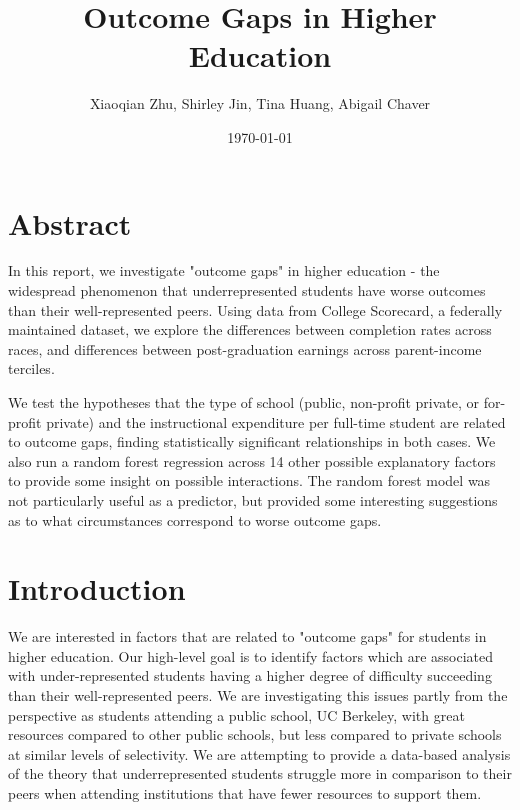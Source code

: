 \documentclass{article}
\title{Outcome Gaps in Higher Education}
\author{Xiaoqian Zhu, Shirley Jin, Tina Huang, Abigail Chaver}
\date{\today}
\begin{document}


\maketitle


\section{Abstract}

In this report, we investigate "outcome gaps" in higher education - the widespread phenomenon that underrepresented students have worse outcomes than their well-represented peers. Using data from College Scorecard, a federally maintained dataset, we explore the differences between completion rates across races, and differences between post-graduation earnings across parent-income terciles.

We test the hypotheses that the type of school (public, non-profit private, or for-profit private) and the instructional expenditure per full-time student are related to outcome gaps, finding statistically significant relationships in both cases. We also run a random forest regression across 14 other possible explanatory factors to provide some insight on possible interactions. The random forest model was not particularly useful as a predictor, but provided some interesting suggestions as to what circumstances correspond to worse outcome gaps.


\section{Introduction}

We are interested in factors that are related to "outcome gaps" for students in higher education. Our high-level goal is to identify factors which are associated with under-represented students having a higher degree of difficulty succeeding than their well-represented peers. We are investigating this issues partly from the perspective as students attending a public school, UC Berkeley, with great resources compared to other public schools, but less compared to private schools at similar levels of selectivity. We are attempting to provide a data-based analysis of the theory that underrepresented students struggle more in comparison to their peers when attending institutions that have fewer resources to support them. 
\end{document}
